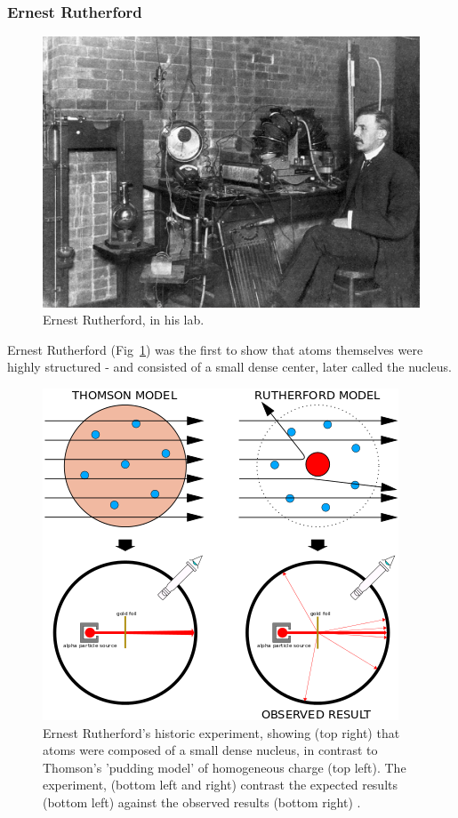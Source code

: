 \subsubsection{Ernest Rutherford}

\begin{figure}[ht]
	\centering
	\includegraphics[width=0.6\linewidth]{./figures/ernestrutherford.jpg}
	\caption{Ernest Rutherford, in his lab.  \cite{Eve1939}}
	\label{fig:rutherford}
\end{figure}

Ernest Rutherford (Fig~\ref{fig:rutherford}) was the first to show that atoms
themselves were highly structured - and consisted of a small dense center, later
called the nucleus.

\begin{figure}[ht]
	\centering
	\includegraphics[width=0.6\linewidth]{./figures/geiger_marsden.png}
	\caption{
		Ernest Rutherford's historic experiment, showing (top right) that atoms were
		composed of a small dense nucleus, in contrast to Thomson's 'pudding model'
		of homogeneous charge (top left). The experiment, (bottom left and right)
		contrast the expected results (bottom left) against the observed results
		(bottom right)  \cite{Kurzon2014}.
	}
	\label{fig:geigermarsden}
\end{figure}

